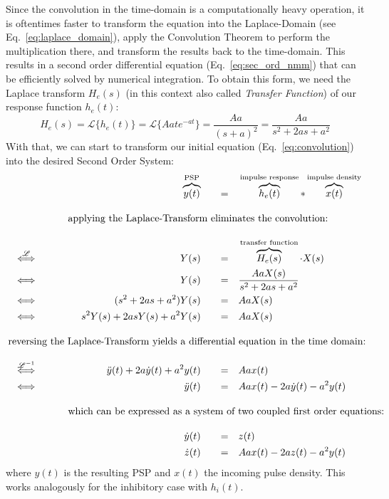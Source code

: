 Since the convolution in the time-domain is a computationally heavy operation,
it is oftentimes faster to transform the equation into the Laplace-Domain (see Eq.~\ref{eq:laplace_domain}),
apply the Convolution Theorem to perform the multiplication there,
and transform the results back to the time-domain.
This results in a second order differential equation (Eq.~\ref{eq:sec_ord_nmm}) that
can be efficiently solved by numerical integration.
To obtain this form, we need the Laplace transform $H_e(s)$ (in this context also called \textit{Transfer Function})
of our response function $h_e(t)$:
\[H_e(s) =\mathscr{L}\{h_e(t)\}  = \mathscr{L}\{Aate^{-at} \} = \frac{Aa}{(s+a)^2} = \frac{Aa}{s^2+2as+a^2}\label{eq:laplace_h_e}\]
With that, we can start to transform our initial equation (Eq.~\ref{eq:convolution}) into the desired Second Order System:
\begin{alignat}{5}
    &                                           & &&          \overbrace{y(t)}^{\text{PSP}} \quad &&=& \quad \overbrace{h_e(t)}^{\text{impulse response}} \ast \overbrace{x(t)}^{\text{impulse density}} \nonumber \\[1em]
    &                                           & \omit\rlap{applying the Laplace-Transform eliminates the convolution:}                 \nonumber \\[1em]
    &  \stackrel{\mathscr{L}}{\iff} \qquad      & &&                             Y(s) \quad &&=& \quad \overbrace{H_e(s)}^{\text{transfer function}} \cdot X(s)  \label{eq:laplace_domain} \\
    &  \iff                                     & &&                             Y(s) \quad &&=& \quad \frac{AaX(s)}{s^2+2as+a^2}  \nonumber \\
    &  \iff                                     & &&               (s^2+2as+a^2) Y(s) \quad &&=& \quad AaX(s) \nonumber \\
    &  \iff                                     & &&          s^{2}Y(s)+2asY(s)+a^{2}Y(s) \quad &&=& \quad AaX(s) \nonumber \\[1em]
    \omit\rlap{reversing the Laplace-Transform yields a differential equation in the time domain:}     \nonumber \\[1em]
    &  \stackrel{\mathscr{L}^{-1}}{\iff} \qquad & && \ddot{y}(t)+2a\dot{y}(t)+a^{2}y(t) \quad &&=& \quad Aax(t) \nonumber \\
    &  \iff                                     & &&                      \ddot{y}(t) \quad &&=& \quad Aax(t)-2a\dot{y}(t)-a^{2}y(t)  \label{eq:sec_ord_nmm} \\[1em]
    &                                           & \omit\rlap{which can be expressed as a system of two coupled first order equations:}                 \nonumber \\[1em]
    &                                           & &&                       \dot{y}(t) \quad &&=& \quad z(t)  \label{eq:y_t}\\
    &                                           & &&                       \dot{z}(t) \quad &&=& \quad Aax(t)-2az(t)-a^{2}y(t)   \label{eq:z_t}
\end{alignat}
where $y(t)$ is the resulting PSP and $x(t)$ the incoming pulse density.
This works analogously for the inhibitory case with $h_i(t)$.

